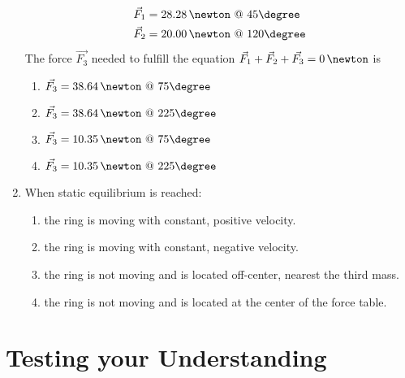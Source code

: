 \begin{enumerate}
\begin{equation*}
\begin{aligned}
      \vec{F}_1 & = 28.28\,\newton \ @ \ 45\degree \\
      \vec{F}_2 & = 20.00\,\newton \ @ \ 120\degree
    \end{aligned}
  \end{equation*}
  The force $\vec{F_{3}}$ needed to fulfill the equation $\vec{F}_1 + \vec{F}_2 + \vec{F_{3}} = 0\,\newton$ is
  \begin{enumerate}
  \item $\vec{F_{3}} = 38.64\,\newton\ @ \ 75\degree$
  \item $\vec{F_{3}} = 38.64\,\newton\ @ \ 225\degree$
  \item $\vec{F_{3}} = 10.35\,\newton\ @ \ 75\degree$
  \item $\vec{F_{3}} = 10.35\,\newton\ @ \ 225\degree$
  \end{enumerate}	
\item When static equilibrium is reached:
  \begin{enumerate}
  \item the ring is moving with constant, positive velocity.
  \item the ring is moving with constant, negative velocity.
  \item the ring is not moving and is located off-center, nearest the third mass.
  \item the ring is not moving and is located at the center of the force table.
  \end{enumerate}
\end{enumerate}













\section{Testing your Understanding}

